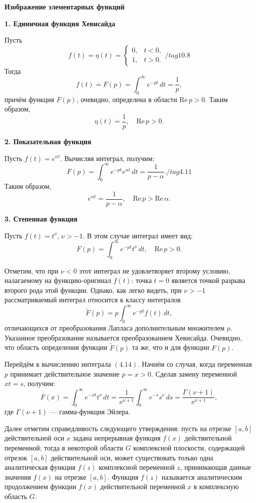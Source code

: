 \textbf {Изображение элементарных функций}{

\textbf{1. Единичная функция Хевисайда}

Пусть 
\[
f(t) = \eta(t) =
\begin{cases} 
0, & t < 0, \\
1, & t > 0.
\end{cases} /tag{10.8}
\]
Тогда 
\[
f(t) \overset{\cdot}{=} F(p) = \int_{0}^{\infty} e^{-pt} \, dt = \frac{1}{p}, \tag{4.9}
\]
причём функция \(F(p)\), очевидно, определена в области \(\text{Re} \, p > 0\). Таким образом,
\[
\eta(t) \overset{\cdot}{=} \frac{1}{p}, \quad \text{Re} \, p > 0. \tag{4.10}
\]

\textbf{2. Показательная функция}

Пусть \(f(t) = e^{\alpha t}\). Вычисляя интеграл, получим:
\[
F(p) = \int_{0}^{\infty} e^{-pt} e^{\alpha t} \, dt = \frac{1}{p - \alpha}./tag{4.11}
\]
Таким образом,
\[
e^{\alpha t} \overset{\cdot}{=} \frac{1}{p - \alpha}, \quad \text{Re} \, p > \text{Re} \, \alpha. \tag{4.12}
\]

\textbf{3. Степенная функция}

Пусть \(f(t) = t^\nu, \, \nu > -1\). В этом случае интеграл имеет вид:
\[
F(p) = \int_{0}^{\infty} e^{-pt} t^\nu \, dt, \quad \text{Re} \, p > 0. \tag{4.13}
\]

Отметим, что при \(\nu < 0\) этот интеграл не удовлетворяет второму условию, налагаемому на функцию-оригинал \(f(t)\): точка \(t = 0\) является точкой разрыва второго рода этой функции. Однако, как легко видеть, при \(\nu > -1\) рассматриваемый интеграл относится к классу интегралов
\[
\widetilde{F}(p) = p \int_{0}^{\infty} e^{-pt} f(t) \, dt, \tag{4.14}
\]
отличающихся от преобразования Лапласа дополнительным множителем \(p\). Указанное преобразование называется преобразованием Хевисайда. Очевидно, что область определения функции \(\widetilde{F}(p)\) та же, что и для функции \(F(p)\).

Перейдём к вычислению интеграла \((4.14)\). Начнём со случая, когда переменная \(p\) принимает действительное значение \(p = x > 0\). Сделав замену переменной \(xt = s\), получим:
\[
F(x) = \int_{0}^{\infty} e^{-xt} t^\nu \, dt = \frac{1}{x^{\nu+1}} \int_{0}^{\infty} e^{-s} s^\nu \, ds = \frac{\Gamma(\nu + 1)}{x^{\nu+1}}, \tag{4.15}
\]
где \(\Gamma(\nu + 1)\) --- гамма-функция Эйлера.

Далее отметим справедливость следующего утверждения: пусть на отрезке \([a, b]\) действительной оси \(x\) задана непрерывная функция \(f(x)\) действительной переменной; тогда в некоторой области \(G\) комплексной плоскости, содержащей отрезок \([a, b]\) действительной оси, может существовать только одна аналитическая функция \(f(z)\) комплексной переменной \(z\), принимающая данные значения \(f(x)\) на отрезке \([a, b]\). Функция \(f(z)\) называется аналитическим продолжением функции \(f(x)\) действительной переменной \(x\) в комплексную область \(G\).

}

